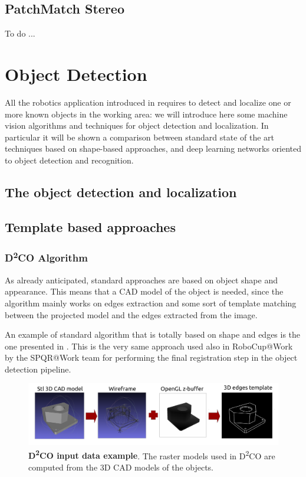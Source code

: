 \subsection{PatchMatch Stereo}\label{subsec:patchmatchstereo}
To do ...

\section{Object Detection}\label{sec:objectdetection}
All the robotics application introduced in  requires to detect and localize one or more known objects in the working area: we will introduce here some machine vision algorithms and techniques for object detection and localization. In particular it will be shown a comparison between standard state of the art techniques based on shape-based approaches, and deep learning networks oriented to object detection and recognition.

\subsection{The object detection and localization}
\subsection{Template based approaches}
\subsubsection{D\textsuperscript{2}{CO} Algorithm}\label{subsec:d2co}
As already anticipated, standard approaches are based on object shape and appearance. This means that a CAD model of the object is needed, since the algorithm mainly works on edges extraction and some sort of template matching between the projected model and the edges extracted from the image.

An example of standard algorithm that is totally based on shape and edges is the one presented in \cite{imperoli2015d2co}. This is the very same approach used also in RoboCup@Work by the SPQR@Work team for performing the final registration step in the object detection pipeline. 

\begin{figure}
    \centering
    \includegraphics[width=\textwidth]{figures/1_perception_and_sensing_in_robotics/d2co_00}
    \caption{\textbf{D\textsuperscript{2}CO input data example}. The raster models used in D\textsuperscript{2}CO are computed from the 3D CAD models of the objects.} 
    \label{fig:d2co_00}
\end{figure}

